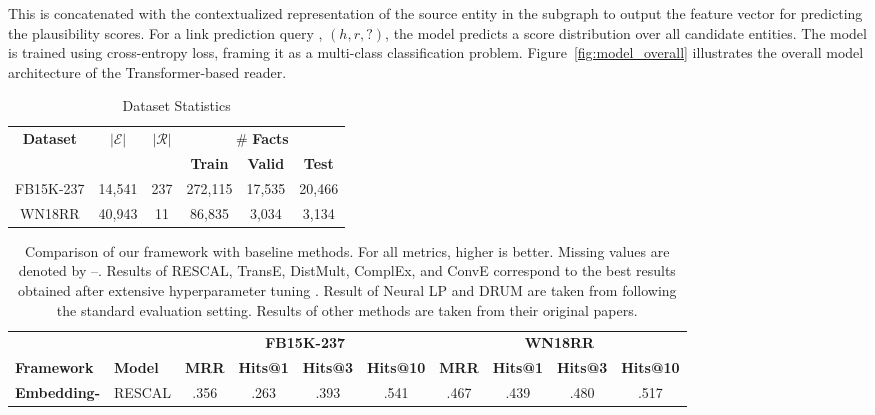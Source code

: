 \noindent This is concatenated with the contextualized representation of the source entity in the subgraph to output the feature vector for predicting the plausibility scores.
For a link prediction query \eg, $(h, r, ?)$, the model predicts a score distribution over all candidate entities. The model is trained using cross-entropy loss, framing it as a multi-class classification problem. Figure~\ref{fig:model_overall} illustrates the overall model architecture of the Transformer-based reader.
\begin{table}[htbp]
\centering
\caption{Dataset Statistics}
\label{tab:dataset_stat}
\begin{tabular}{cccccc}
\toprule
\bfseries Dataset   & $\bm{|\mathcal{E}|}$      & \bfseries $\bm{|\mathcal{R}|}$   & \multicolumn{3}{c}{\# \bfseries Facts} \\ \cmidrule{4-6}
          &        &     & \bfseries Train    & \bfseries Valid   & \bfseries Test                      \\ \midrule
FB15K-237 & 14,541 & 237 & 272,115  & 17,535  & 20,466            \\
WN18RR    & 40,943 & 11  & 86,835   & 3,034   & 3,134       \\ \bottomrule        
\end{tabular}
\end{table} \begin{table*}[htbp]
\centering
\caption{Comparison of our framework with baseline methods. For all metrics, higher is better. Missing values are denoted by --. Results of RESCAL, TransE, DistMult, ComplEx, and ConvE correspond to the best results obtained after extensive hyperparameter tuning \citep{Ruffinelli2020You}.
Result of Neural LP and DRUM are taken from \citet{DBLP:conf/iclr/QuCXBT21} following the standard evaluation setting.
Results of other methods are taken from their original papers.
}
\label{tab:results_overall}
\begin{tabular}{llcccc|cccc}
\toprule
& & \multicolumn{4}{c}{\bfseries FB15K-237} & \multicolumn{4}{c}{\bfseries WN18RR} \\ \cmidrule{2-10}
\bfseries Framework & \bfseries Model                                  & \bfseries MRR        & \bfseries Hits@1    & \bfseries Hits@3    & \bfseries Hits@10   & \bfseries MRR      & \bfseries Hits@1   & \bfseries Hits@3   & \bfseries Hits@10   \\ \midrule
\textbf{Embedding-} & RESCAL \citep{nickel2011three} & .356	& .263 & .393 & .541 & .467	& .439 & .480 & .517 \\

\end{tabular}
\end{table*}
